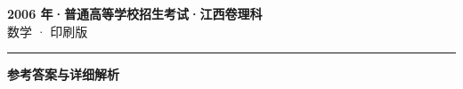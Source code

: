 \documentclass[zihao=5, a4paper]{ctexart}
\begin{document}
\begin{center}
  {\Large\bfseries 2006 年·普通高等学校招生考试·江西卷理科}\\[4pt]
  {\large 数学 · 印刷版}
\end{center}
\medskip
{}

\par\bigskip\hrule\bigskip
{}
\begin{center}{\large\bfseries 参考答案与详细解析}\end{center}
\smallskip

\end{document}
